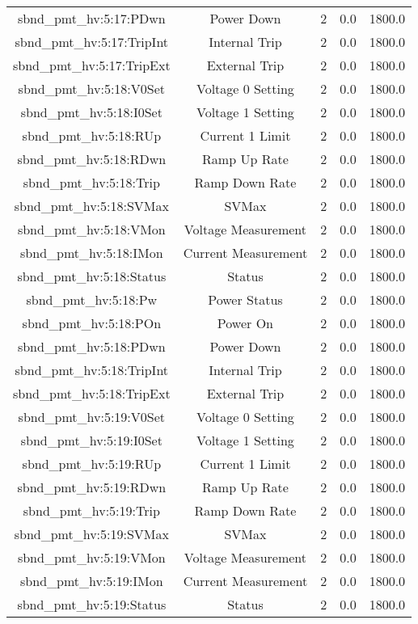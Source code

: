 \begin{center}
\begin{longtable}{c | c c c c }
sbnd\_pmt\_hv:5:17:PDwn & Power Down & 2 & 0.0 & 1800.0\\ 
sbnd\_pmt\_hv:5:17:TripInt & Internal Trip & 2 & 0.0 & 1800.0\\ 
sbnd\_pmt\_hv:5:17:TripExt & External Trip & 2 & 0.0 & 1800.0\\ 
sbnd\_pmt\_hv:5:18:V0Set & Voltage 0 Setting & 2 & 0.0 & 1800.0\\ 
sbnd\_pmt\_hv:5:18:I0Set & Voltage 1 Setting & 2 & 0.0 & 1800.0\\ 
sbnd\_pmt\_hv:5:18:RUp & Current 1 Limit & 2 & 0.0 & 1800.0\\ 
sbnd\_pmt\_hv:5:18:RDwn & Ramp Up Rate & 2 & 0.0 & 1800.0\\ 
sbnd\_pmt\_hv:5:18:Trip & Ramp Down Rate & 2 & 0.0 & 1800.0\\ 
sbnd\_pmt\_hv:5:18:SVMax & SVMax & 2 & 0.0 & 1800.0\\ 
sbnd\_pmt\_hv:5:18:VMon & Voltage Measurement & 2 & 0.0 & 1800.0\\ 
sbnd\_pmt\_hv:5:18:IMon & Current Measurement & 2 & 0.0 & 1800.0\\ 
sbnd\_pmt\_hv:5:18:Status & Status & 2 & 0.0 & 1800.0\\ 
sbnd\_pmt\_hv:5:18:Pw & Power Status & 2 & 0.0 & 1800.0\\ 
sbnd\_pmt\_hv:5:18:POn & Power On & 2 & 0.0 & 1800.0\\ 
sbnd\_pmt\_hv:5:18:PDwn & Power Down & 2 & 0.0 & 1800.0\\ 
sbnd\_pmt\_hv:5:18:TripInt & Internal Trip & 2 & 0.0 & 1800.0\\ 
sbnd\_pmt\_hv:5:18:TripExt & External Trip & 2 & 0.0 & 1800.0\\ 
sbnd\_pmt\_hv:5:19:V0Set & Voltage 0 Setting & 2 & 0.0 & 1800.0\\ 
sbnd\_pmt\_hv:5:19:I0Set & Voltage 1 Setting & 2 & 0.0 & 1800.0\\ 
sbnd\_pmt\_hv:5:19:RUp & Current 1 Limit & 2 & 0.0 & 1800.0\\ 
sbnd\_pmt\_hv:5:19:RDwn & Ramp Up Rate & 2 & 0.0 & 1800.0\\ 
sbnd\_pmt\_hv:5:19:Trip & Ramp Down Rate & 2 & 0.0 & 1800.0\\ 
sbnd\_pmt\_hv:5:19:SVMax & SVMax & 2 & 0.0 & 1800.0\\ 
sbnd\_pmt\_hv:5:19:VMon & Voltage Measurement & 2 & 0.0 & 1800.0\\ 
sbnd\_pmt\_hv:5:19:IMon & Current Measurement & 2 & 0.0 & 1800.0\\ 
sbnd\_pmt\_hv:5:19:Status & Status & 2 & 0.0 & 1800.0\\ 

\end{longtable}
\end{center}
